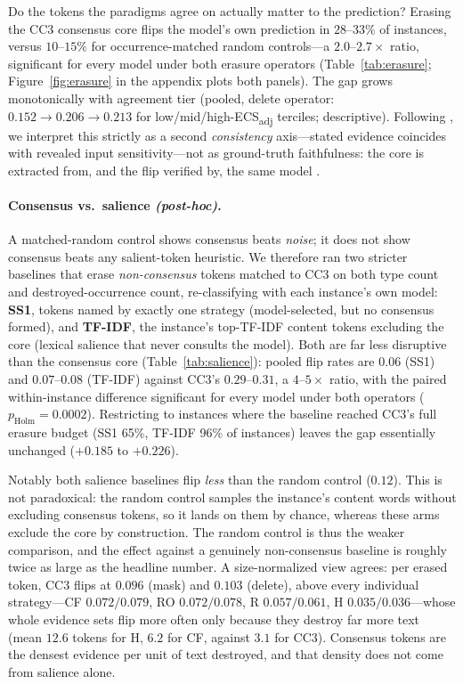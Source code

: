 \documentclass[11pt]{article}
\newcommand{\ecsadj}{\mbox{ECS\textsubscript{adj}}}
\newcommand{\holm}[1]{$p_{\mathrm{Holm}}{=}#1$}
\begin{document}
Do the tokens the paradigms agree on actually matter to the prediction? Erasing the CC3 consensus core flips the model's own prediction in $28$--$33\%$ of instances, versus $10$--$15\%$ for occurrence-matched random controls---a $2.0$--$2.7\times$ ratio, significant for every model under both erasure operators (Table~\ref{tab:erasure}; Figure~\ref{fig:erasure} in the appendix plots both panels). The gap grows monotonically with agreement tier (pooled, delete operator: $0.152 \to 0.206 \to 0.213$ for low/mid/high-\ecsadj{} terciles; descriptive). Following \citet{parcalabescu2024measuring}, we interpret this strictly as a second \emph{consistency} axis---stated evidence coincides with revealed input sensitivity---not as ground-truth faithfulness: the core is extracted from, and the flip verified by, the same model \citep{atanasova2020diagnostic,deyoung2020eraser}. \paragraph{Consensus vs.\ salience \emph{(post-hoc)}.} A matched-random control shows consensus beats \emph{noise}; it does not show consensus beats any salient-token heuristic. We therefore ran two stricter baselines that erase \emph{non-consensus} tokens matched to CC3 on both type count and destroyed-occurrence count, re-classifying with each instance's own model: \textbf{SS1}, tokens named by exactly one strategy (model-selected, but no consensus formed), and \textbf{TF-IDF}, the instance's top-TF-IDF content tokens excluding the core (lexical salience that never consults the model). Both are far less disruptive than the consensus core (Table~\ref{tab:salience}): pooled flip rates are $0.06$ (SS1) and $0.07$--$0.08$ (TF-IDF) against CC3's $0.29$--$0.31$, a $4$--$5\times$ ratio, with the paired within-instance difference significant for every model under both operators (\holm{0.0002}). Restricting to instances where the baseline reached CC3's full erasure budget (SS1 65\%, TF-IDF 96\% of instances) leaves the gap essentially unchanged ($+0.185$ to $+0.226$).

Notably both salience baselines flip \emph{less} than the random control ($0.12$). This is not paradoxical: the random control samples the instance's content words without excluding consensus tokens, so it lands on them by chance, whereas these arms exclude the core by construction. The random control is thus the weaker comparison, and the effect against a genuinely non-consensus baseline is roughly twice as large as the headline number. A size-normalized view agrees: per erased token, CC3 flips at $0.096$ (mask) and $0.103$ (delete), above every individual strategy---CF $0.072/0.079$, RO $0.072/0.078$, R $0.057/0.061$, H $0.035/0.036$---whose whole evidence sets flip more often only because they destroy far more text (mean $12.6$ tokens for H, $6.2$ for CF, against $3.1$ for CC3). Consensus tokens are the densest evidence per unit of text destroyed, and that density does not come from salience alone.
\end{document}
